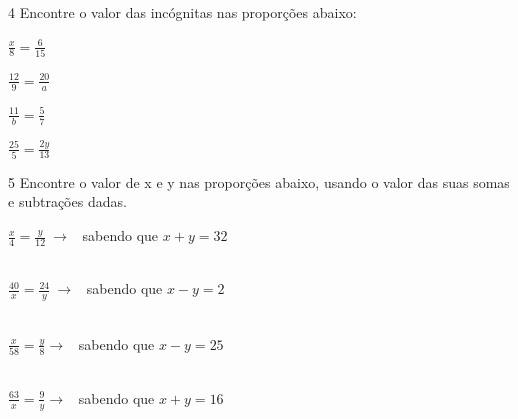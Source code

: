 \num{4} Encontre o valor das incógnitas nas proporções abaixo:

\begin{escolha}[itemsep=0pt]
\item $\frac{x}{8} = \frac{6}{15}$ \  \\
\item $\frac{12}{9} = \frac{20}{a}$ \  \\
\item $\frac{11}{b} = \frac{5}{7}$ \  \\
\item $\frac{25}{5} = \frac{2y}{13}$ \  \\
\end{escolha}

\num{5} Encontre o valor de x e y nas proporções abaixo, usando o valor das
suas somas e subtrações dadas.

\begin{escolha}[itemsep=0pt]

\item $\frac{x}{4} = \frac{y}{12}\  \rightarrow$ \ sabendo que $x + y = 32$ \\

 \\

\item $\frac{40}{x} = \frac{24}{y}\  \rightarrow$ \ sabendo que $x - y = 2$ \\

 \\

\item $\frac{x}{58} = \frac{y}{8} \rightarrow$ \ sabendo que $x - y = 25$ \\

 \\

\item $\frac{63}{x} = \frac{9}{y} \rightarrow$ \ sabendo que $x + y = 16$ \\

 \\

\end{escolha}

